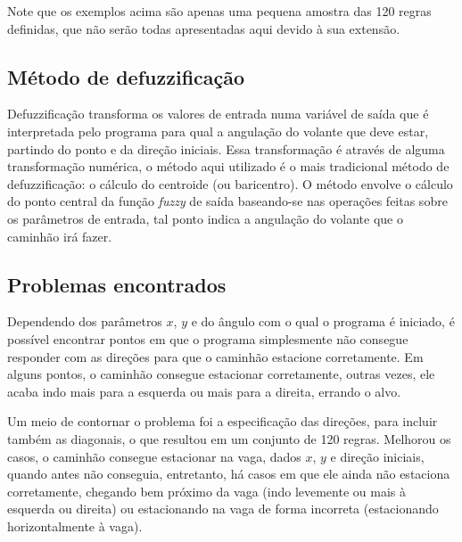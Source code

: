 \documentclass{article}
\begin{document}
        Note que os exemplos acima são apenas uma pequena amostra das 120
        regras definidas, que não serão todas apresentadas aqui devido à sua
        extensão. 
        
    \subsection*{Método de defuzzificação}
        Defuzzificação transforma os valores de entrada numa variável de saída
        que é interpretada pelo programa para qual a angulação do volante que
        deve estar, partindo do ponto e da direção iniciais. Essa transformação
        é através de alguma transformação numérica, o método aqui utilizado é o
        mais tradicional método de defuzzificação: o cálculo do centroide (ou
        baricentro). O método envolve o cálculo do ponto central da função
        \textit{fuzzy} de saída baseando-se nas operações feitas sobre os
        parâmetros de entrada, tal ponto indica a angulação do volante que o
        caminhão irá fazer.
        
    \subsection*{Problemas encontrados}
        Dependendo dos parâmetros $x$, $y$ e do ângulo com o qual o programa é
        iniciado, é possível encontrar pontos em que o programa simplesmente
        não consegue responder com as direções para que o caminhão estacione
        corretamente. Em alguns pontos, o caminhão consegue estacionar
        corretamente, outras vezes, ele acaba indo mais para a esquerda ou mais
        para a direita, errando o alvo.
        
        Um meio de contornar o problema foi a especificação das direções, para
        incluir também as diagonais, o que resultou em um conjunto de 120
        regras. Melhorou os casos, o caminhão consegue estacionar na vaga,
        dados $x$, $y$ e direção iniciais, quando antes não conseguia,
        entretanto, há casos em que ele ainda não estaciona corretamente,
        chegando bem próximo da vaga (indo levemente ou mais à esquerda ou
        direita) ou estacionando na vaga de forma incorreta (estacionando
        horizontalmente à vaga).
\end{document}
